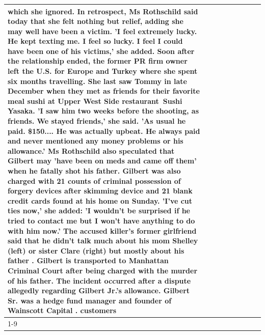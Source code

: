 \begin{table}[H]
\begin{tabular}{lllrlllll}
which she ignored. In retrospect, Ms Rothschild said today that she felt nothing but relief, adding she may well have been a victim. 'I feel extremely lucky. He kept texting me. I feel so lucky. I feel I could have been one of his victims,' she added. Soon after the relationship ended, the former PR firm owner left the U.S. for Europe and Turkey where she spent six months  travelling. She last saw Tommy in late December when they met as friends for their favorite meal sushi at Upper West Side restaurant Sushi Yasaka. 'I saw him two weeks before the shooting, as friends. We stayed friends,' she said. 'As usual he paid. \$150.... He was actually upbeat. He always paid and never mentioned any money problems or his allowance.' Ms Rothschild also speculated that Gilbert may 'have been on meds and came off them' when he fatally shot his father. Gilbert was also charged with 21 counts of criminal possession of forgery devices after skimming device and 21 blank credit cards found at his home on Sunday. 'I've cut ties now,' she added: 'I wouldn’t be surprised if he tried to contact me but I won’t have anything to do with him now.' The accused killer's former girlfriend said that he didn't talk much about his mom Shelley (left) or sister Clare (right) but mostly about his father . Gilbert is transported to Manhattan Criminal Court  after being charged with the murder of his father. The incident occurred after a dispute allegedly regarding Gilbert Jr.'s allowance. Gilbert Sr. was a hedge fund manager and founder of Wainscott Capital . customers \\
\cline{1-9}

\end{tabular}
\end{table}
